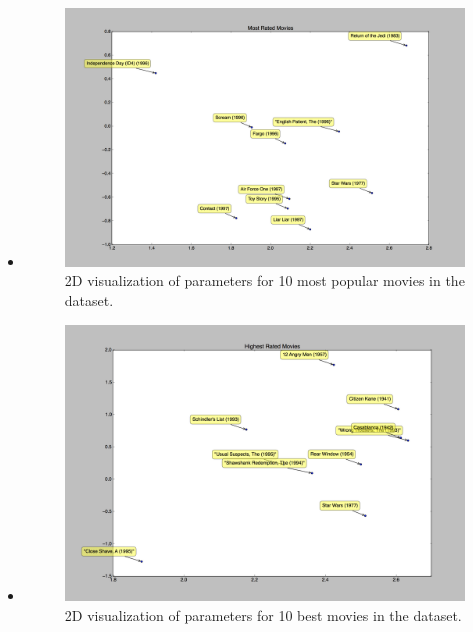 \begin{itemize}
    \pagebreak
    \item {}

    \begin{figure}[H]
    \centering
    \includegraphics[width=\textwidth]{popular_2d_vis}
    \caption{2D visualization of parameters for 10 most popular movies in the dataset.}
    \end{figure}


    \pagebreak
    \item {}

    \begin{figure}[H]
    \centering
    \includegraphics[width=\textwidth]{highest_2d_vis}
    \caption{2D visualization of parameters for 10 best movies in the dataset.}
    \end{figure}




\end{itemize}
